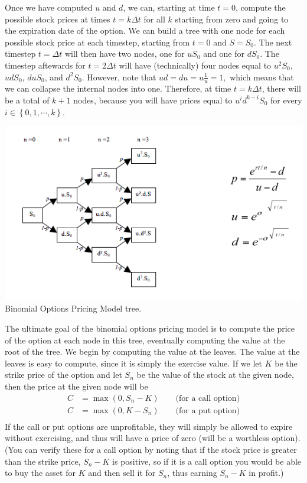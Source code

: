 \documentclass[11pt]{article}
\newcommand\del[1]{\left(#1\right)}
\newcommand\set[1]{\left\{#1\right\}}
\begin{document}
Once we have computed $u$ and $d$, we can, starting at time $t = 0$, compute the possible stock
prices at times $t = k\Delta t$ for all $k$ starting from zero and going to the expiration date of
the option. We can build a tree with one node for each possible stock price at each timestep,
starting from $t = 0$ and $S = S_0$. The next timestep $t = \Delta t$ will then have two nodes, one
for $uS_0$ and one for $dS_0$. The timestep aftewards for $t = 2\Delta t$ will have (technically)
four nodes equal to $u^2S_0$, $udS_0$, $duS_0$, and $d^2S_0$. However, note that \(ud = du =
u\frac{1}{u} = 1,\) which means that we can collapse the internal nodes into one. Therefore, at time
$t=k\Delta t$, there will be a total of $k+1$ nodes, because you will have prices equal to $u^i
d^{k-i}S_0$ for every $i \in \set{0, 1, \cdots, k}$.

\includegraphics[scale=0.5]{images/bopm.png}\\
Binomial Options Pricing Model tree.

The ultimate goal of the binomial options pricing model is to compute the price of the option at
each node in this tree, eventually computing the value at the root of the tree. We begin by
computing the value at the leaves. The value at the leaves is easy to compute, since it is simply
the exercise value. If we let $K$ be the strike price of the option and let $S_n$ be the value of
the stock at the given node, then the price at the given node will be
\begin{align*}
    C &= \max \del{0, S_n - K} \qquad \text{(for a call option)} \\
    C &= \max \del{0, K - S_n} \qquad \text{(for a put option)} \\
\end{align*}
If the call or put options are unprofitable, they will simply be allowed to expire without
exercising, and thus will have a price of zero (will be a worthless option). (You can verify these
for a call option by noting that if the stock price is greater than the strike price, $S_n - K$ is
positive, so if it is a call option you would be able to buy the asset for $K$ and then sell it for
$S_n$, thus earning $S_n - K$ in profit.)
\end{document}
